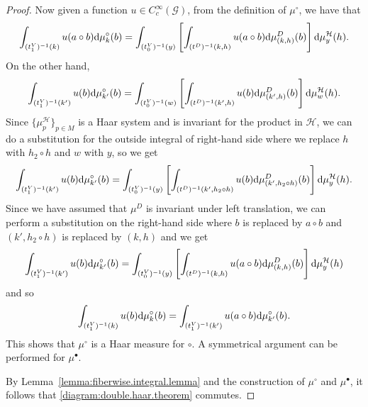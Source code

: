 \documentclass[pdftex]{sigma}
\numberwithin{equation}{section}
\theoremstyle{definition}
\newcommand{\CG}{\mathcal{G}}
\newcommand{\CH}{\mathcal{H}}
\newcommand{\inv}{^{-1}}
\begin{document}
\begin{proof}
Now given a function $ u \in C^\infty_c(\CG) $, from the definition of $ \mu^\circ $, we have that
       \[ \int_{(t^V_1)\inv(k)} u(a \circ b) {\rm d} \mu_k^\circ(b) = \int_{(t^V_0)\inv(y)} \left[ \int_{(t^D)\inv(k,h)} u(a \circ b) {\rm d} \mu_{(k,h)}^D(b) \right] {\rm d} \mu_{y}^\CH(h).
     \]
    On the other hand,
    \[
       \int_{(t^V_1)\inv(k')} u( b) {\rm d} \mu_{k'}^\circ (b) = \int_{(t^V_0)\inv(w)} \left[ \int_{(t^D)\inv(k', h)} u( b) {\rm d} \mu_{(k',h)}^D(b) \right] {\rm d} \mu_{w}^\CH(h).
    \]
       Since $ \big\{ \mu_p^\CH\big\}_{p \in M } $ is a Haar system and is invariant for the product in $ \CH $, we can do a substitution for the outside integral of right-hand side where we replace $ h $ with $ h_2 \circ h $ and $ w $ with $ y $, so we get
    \[
       \int_{(t^V_1)\inv(k')} u( b) {\rm d} \mu_{k'}^\circ (b) = \int_{(t^V_0)\inv(y)} \left[ \int_{(t^D)\inv(k', h_2 \circ h)} u(b) {\rm d} \mu_{(k', h_2 \circ h)}^D(b) \right] {\rm d} \mu_{y}^\CH(h).
    \]
       Since we have assumed that $ \mu^D $ is invariant under left translation, we can perform a substitution on the right-hand side where $ b $ is replaced by $ a \circ b $ and $ (k', h_2 \circ h)$ is replaced by $ (k,h) $ and we get
     \[
       \int_{(t^V_1)\inv(k')} u( b) {\rm d} \mu_{k'}^\circ (b) = \int_{(t^V_0)\inv(y)} \left[ \int_{(t^D)\inv(k,h)} u(a \circ b) {\rm d} \mu_{(k,h)}^D(b) \right] {\rm d} \mu_{y}^\CH(h)
    \]
    and so
    \[
     \int_{(t^V_1)\inv(k)} u(b) {\rm d} \mu_{k}^\circ(b) = \int_{(t^V_1)\inv(k')} u( a \circ b) {\rm d} \mu_{k'}^\circ (b).
    \]
  This shows that $ \mu^\circ $ is a Haar measure for $ \circ $. A symmetrical argument can be performed for $ \mu^\bullet $.

  By Lemma~\ref{lemma:fiberwise.integral.lemma} and the construction of $ \mu^\circ $ and $ \mu^\bullet $, it follows that \eqref{diagram:double.haar.theorem} commutes.
  \end{proof}
\end{document}
